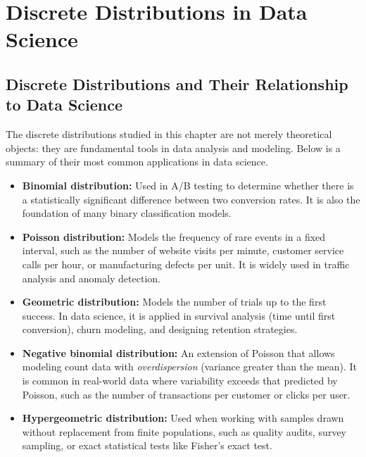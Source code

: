 

\section{Discrete Distributions in Data Science}
\subsection{Discrete Distributions and Their Relationship to Data Science}

The discrete distributions studied in this chapter are not merely theoretical objects: they are fundamental tools in data analysis and modeling. Below is a summary of their most common applications in data science.

\begin{itemize}
 \item \textbf{Binomial distribution:} Used in A/B testing to determine whether there is a statistically significant difference between two conversion rates. It is also the foundation of many binary classification models.

 \item \textbf{Poisson distribution:} Models the frequency of rare events in a fixed interval, such as the number of website visits per minute, customer service calls per hour, or manufacturing defects per unit. It is widely used in traffic analysis and anomaly detection.

 \item \textbf{Geometric distribution:} Models the number of trials up to the first success. In data science, it is applied in survival analysis (time until first conversion), churn modeling, and designing retention strategies.

 \item \textbf{Negative binomial distribution:} An extension of Poisson that allows modeling count data with \emph{overdispersion} (variance greater than the mean). It is common in real-world data where variability exceeds that predicted by Poisson, such as the number of transactions per customer or clicks per user.

 \item \textbf{Hypergeometric distribution:} Used when working with samples drawn without replacement from finite populations, such as quality audits, survey sampling, or exact statistical tests like Fisher's exact test.
\end{itemize}


